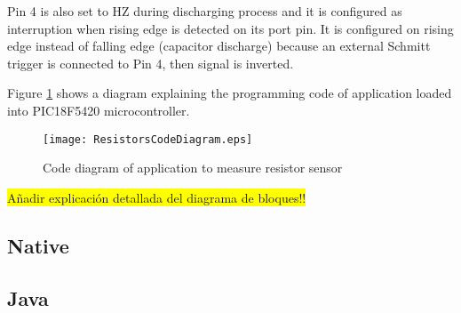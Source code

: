 Pin 4 is also set to HZ during discharging process and it is configured as interruption when rising edge is detected on its port pin. It is configured on rising edge instead of falling edge (capacitor discharge) because an external Schmitt trigger is connected to Pin 4, then signal is inverted.
\medskip

Figure \ref{fig:ResistorsCodeDiagram} shows a diagram explaining the programming code of application loaded into PIC18F5420 microcontroller.
\medskip

\begin{figure}[!ht]
\centering
\texttt{[image: ResistorsCodeDiagram.eps]}
\caption{Code diagram of application to measure resistor sensor}
\label{fig:ResistorsCodeDiagram}
\end{figure}

\colorbox{yellow}{Añadir explicación detallada del diagrama de bloques!!}
\subsection{Native}\label{SS:Res:Code:Native}
\subsection{Java}\label{SS:Res:Code:Java}